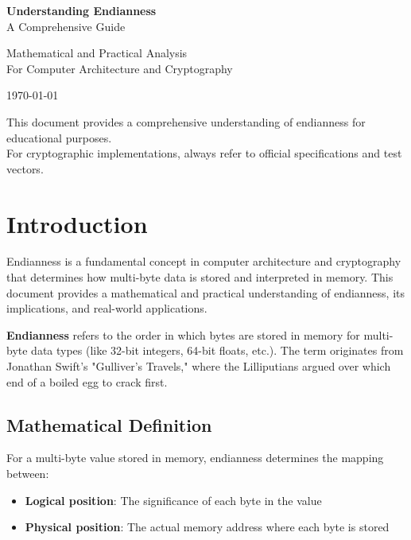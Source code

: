 \documentclass[11pt,a4paper]{article}
\begin{document}
\begin{titlepage}
    \centering
    \vspace*{2cm}
    
    {\Huge\bfseries\color{blue} Understanding Endianness}\\[0.5cm]
    {\Large A Comprehensive Guide}\\[1cm]
    
    \vspace{1cm}
    
    {\large Mathematical and Practical Analysis}\\[0.5cm]
    {\large For Computer Architecture and Cryptography}\\[2cm]
    
    \vspace{2cm}
    
    {\large \today}
    
    \vfill
    
    {\small This document provides a comprehensive understanding of endianness for educational purposes.\\
    For cryptographic implementations, always refer to official specifications and test vectors.}
\end{titlepage}

\tableofcontents
\newpage

\section{Introduction}

Endianness is a fundamental concept in computer architecture and cryptography that determines how multi-byte data is stored and interpreted in memory. This document provides a mathematical and practical understanding of endianness, its implications, and real-world applications.

\begin{definitionbox}
\textbf{Endianness} refers to the order in which bytes are stored in memory for multi-byte data types (like 32-bit integers, 64-bit floats, etc.). The term originates from Jonathan Swift's "Gulliver's Travels," where the Lilliputians argued over which end of a boiled egg to crack first.
\end{definitionbox}

\subsection{Mathematical Definition}
For a multi-byte value stored in memory, endianness determines the mapping between:
\begin{itemize}
    \item \textbf{Logical position}: The significance of each byte in the value
    \item \textbf{Physical position}: The actual memory address where each byte is stored
\end{itemize}
\end{document}
